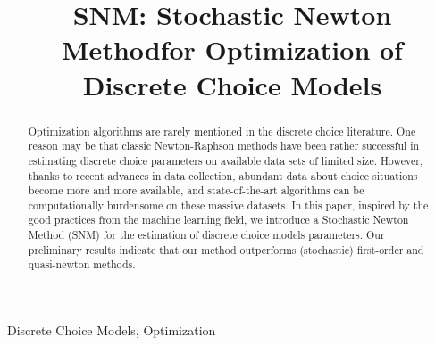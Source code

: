 \documentclass[conference]{IEEEtran}
\begin{document}
\title{\vspace{0.6cm}
SNM: Stochastic Newton Methodfor Optimization of Discrete Choice Models}

\author{
\and
{}
\and
{}
}

\maketitle

\begin{abstract}

Optimization algorithms are rarely mentioned in the discrete choice literature. One reason may be that classic Newton-Raphson methods have been rather successful in estimating discrete choice parameters on available data sets of limited size. However, thanks to recent advances in data collection, abundant data about choice situations become more and more available, and state-of-the-art algorithms can be computationally burdensome on these massive datasets.  In this paper, inspired by the good practices from the machine learning field, we introduce a Stochastic Newton Method (SNM) for the estimation of discrete choice models parameters. Our preliminary results indicate that our method outperforms (stochastic) first-order and quasi-newton methods. 
\end{abstract}

\begin{IEEEkeywords}
Discrete Choice Models, Optimization
\end{IEEEkeywords}
\end{document}
